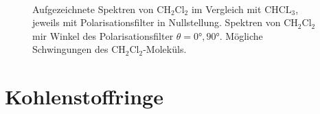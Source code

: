 \documentclass[../bericht.tex]{subfiles}
\begin{document}
\begin{figure}
{
            \label{fig:ch2cl2}
          } \\
          \caption[Aufgezeichnete Spektren von $\mathrm{CH_2Cl_2}$ und mögliche Schwingungen des Moleküls.]{\protect{} Aufgezeichnete Spektren von $\mathrm{CH_2Cl_2}$ im Vergleich mit $\mathrm{CHCL_3}$, jeweils mit Polarisationsfilter in Nullstellung. \protect{} Spektren von $\mathrm{CH_2Cl_2}$ mir Winkel des Polarisationsfilter $\theta=\ang{0},\ang{90}$. \protect{} Mögliche Schwingungen des $\mathrm{CH_2Cl_2}$-Moleküls. \cite{herzberg}}
          \label{fig:ch2cl2-analyse}
        \end{figure}


    \section{Kohlenstoffringe}
\end{document}
